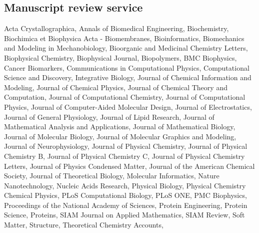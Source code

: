 \documentclass[11pt,letterpaper,sans]{moderncv}
\newif\ifcommunity
\newif\ifmanuscriptreviews
\begin{document}
\ifcommunity \subsection{Selected community service}

\cventry{2016}{Judge}{Mathematics, Engineering, Science Achievement (MESA) USA Engineering Design Competition}{Pasco, WA}{}{}
\cventry{2014--present}{Communications representative}{Hansen Park Homeowners Association}{Kennewick, WA}{}{}
\cventry{2012--2014}{Webmaster}{Hansen Park Homeowners Association}{Kennewick, WA}{}{}
\cventry{2010--2011}{Den leader}{Cub Scouts}{Kennewick, WA}{}{}
\cventry{2006--2010}{Member, Technology Committee}{Our Lady of Lourdes School}{St Louis, MO}{}{}
\cventry{2005--2010}{Webmaster}{Ethical Society Nursery School}{St Louis, MO}{}{}

\fi %

\ifmanuscriptreviews \subsection{Manuscript review service}

Acta Crystallographica,
Annals of Biomedical Engineering,
Biochemistry,
Biochimica et Biophysica Acta - Biomembranes,
Bioinformatics,
Biomechanics and Modeling in Mechanobiology,
Bioorganic and Medicinal Chemistry Letters,
Biophysical Chemistry,
Biophysical Journal,
Biopolymers,
BMC Biophysics,
Cancer Biomarkers,
Communications in Computational Physics,
Computational Science and Discovery,
Integrative Biology,
Journal of Chemical Information and Modeling,
Journal of Chemical Physics,
Journal of Chemical Theory and Computation,
Journal of Computational Chemistry,
Journal of Computational Physics,
Journal of Computer-Aided Molecular Design,
Journal of Electrostatics,
Journal of General Physiology,
Journal of Lipid Research,
Journal of Mathematical Analysis and Applications,
Journal of Mathematical Biology,
Journal of Molecular Biology,
Journal of Molecular Graphics and Modeling,
Journal of Neurophysiology,
Journal of Physical Chemistry,
Journal of Physical Chemistry B,
Journal of Physical Chemistry C,
Journal of Physical Chemistry Letters,
Journal of Physics Condensed Matter,
Journal of the American Chemical Society,
Journal of Theoretical Biology,
Molecular Informatics,
Nature Nanotechnology,
Nucleic Acids Research,
Physical Biology,
Physical Chemistry Chemical Physics,
PLoS Computational Biology,
PLoS ONE,
PMC Biophysics,
Proceedings of the National Academy of Sciences,
Protein Engineering,
Protein Science,
Proteins,
SIAM Journal on Applied Mathematics,
SIAM Review,
Soft Matter,
Structure,
Theoretical Chemistry Accounts,
\end{document}

